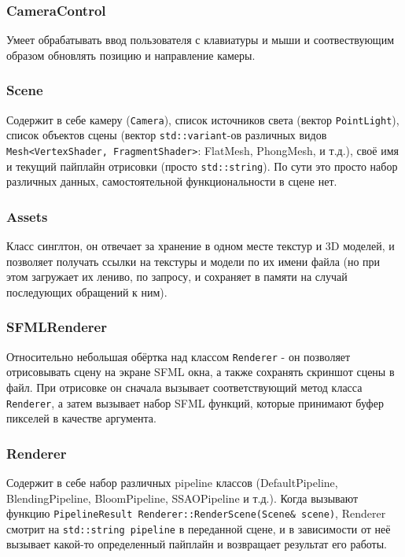 \documentclass[14pt]{extarticle}
\begin{document}
\subsubsection{CameraControl}
Умеет обрабатывать ввод пользователя с клавиатуры и мыши и соотвествующим образом обновлять позицию и направление камеры. 

\subsubsection{Scene}
Содержит в себе камеру (\texttt{Camera}), список источников света (вектор \texttt{PointLight}), список объектов сцены (вектор \texttt{std::variant}-ов различных видов \texttt{Mesh<VertexShader, FragmentShader>}: FlatMesh, PhongMesh, и т.д.), своё имя и текущий пайплайн отрисовки (просто \texttt{std::string}).
По сути это просто набор различных данных, самостоятельной функциональности в сцене нет.

\subsubsection{Assets}
Класс синглтон, он отвечает за хранение в одном месте текстур и 3D моделей, и позволяет получать ссылки на текстуры и модели по их имени файла (но при этом загружает их лениво, по запросу, и сохраняет в памяти на случай последующих обращений к ним).

\subsubsection{SFMLRenderer}
Относительно небольшая обёртка над классом \texttt{Renderer} - он позволяет отрисовывать сцену на экране SFML окна, а также сохранять скриншот сцены в файл. При отрисовке он сначала вызывает соответствующий метод класса \texttt{Renderer}, а затем вызывает набор SFML функций, которые принимают буфер пикселей в качестве аргумента.

\subsubsection{Renderer}
Содержит в себе набор различных pipeline классов (DefaultPipeline, BlendingPipeline, BloomPipeline, SSAOPipeline и т.д.). 
Когда вызывают функцию \texttt{PipelineResult Renderer::RenderScene(Scene& scene)}, Renderer смотрит на \texttt{std::string pipeline} в переданной сцене, и в зависимости от неё вызывает какой-то определенный пайплайн и возвращает результат его работы.
\end{document}
